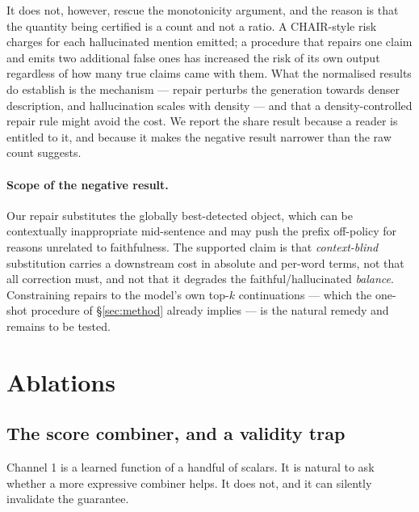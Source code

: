 \documentclass[review,number,doubleblind]{elsarticle}
\theoremstyle{plain}
\theoremstyle{definition}
\theoremstyle{remark}
\begin{document}
It does not, however, rescue the monotonicity argument, and the reason is that the quantity
being certified is a count and not a ratio. A CHAIR-style risk charges for each hallucinated
mention emitted; a procedure that repairs one claim and emits two additional false ones has
increased the risk of its own output regardless of how many true claims came with them. What
the normalised results do establish is the mechanism --- repair perturbs the generation
towards denser description, and hallucination scales with density --- and that a
density-controlled repair rule might avoid the cost. We report the share result because a
reader is entitled to it, and because it makes the negative result narrower than the raw
count suggests.

\paragraph{Scope of the negative result.}
Our repair substitutes the globally best-detected object, which can be contextually
inappropriate mid-sentence and may push the prefix off-policy for reasons unrelated to
faithfulness. The supported claim is that \emph{context-blind} substitution carries a
downstream cost in absolute and per-word terms, not that all correction must, and not that
it degrades the faithful/hallucinated \emph{balance}. Constraining repairs to the model's
own top-$k$ continuations --- which the one-shot procedure of \S\ref{sec:method} already
implies --- is the natural remedy and remains to be tested.

\section{Ablations}
\label{sec:ablations}

\subsection{The score combiner, and a validity trap}

Channel 1 is a learned function of a handful of scalars. It is natural to ask whether a
more expressive combiner helps. It does not, and it can silently invalidate the guarantee.
\end{document}

